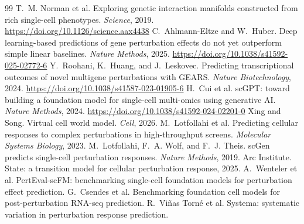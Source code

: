 \documentclass[11pt]{article}
\begin{document}
\begin{thebibliography}{99}
 T.~M. Norman et al. Exploring genetic interaction manifolds constructed from rich single-cell phenotypes. \emph{Science}, 2019. \url{https://doi.org/10.1126/science.aax4438}
 C.~Ahlmann-Eltze and W.~Huber. Deep learning-based predictions of gene perturbation effects do not yet outperform simple linear baselines. \emph{Nature Methods}, 2025. \url{https://doi.org/10.1038/s41592-025-02772-6}
 Y.~Roohani, K.~Huang, and J.~Leskovec. Predicting transcriptional outcomes of novel multigene perturbations with GEARS. \emph{Nature Biotechnology}, 2024. \url{https://doi.org/10.1038/s41587-023-01905-6}
 H.~Cui et al. scGPT: toward building a foundation model for single-cell multi-omics using generative AI. \emph{Nature Methods}, 2024. \url{https://doi.org/10.1038/s41592-024-02201-0}
 Xing and Song. Virtual cell world model. \emph{Cell}, 2026. %
 M.~Lotfollahi et al. Predicting cellular responses to complex perturbations in high-throughput screens. \emph{Molecular Systems Biology}, 2023. %
 M.~Lotfollahi, F.~A. Wolf, and F.~J. Theis. scGen predicts single-cell perturbation responses. \emph{Nature Methods}, 2019. %
 Arc Institute. State: a transition model for cellular perturbation response, 2025. %
 A.~Wenteler et al. PertEval-scFM: benchmarking single-cell foundation models for perturbation effect prediction. %
 G.~Csendes et al. Benchmarking foundation cell models for post-perturbation RNA-seq prediction. %
 R.~Vi\~nas Torn\'e et al. Systema: systematic variation in perturbation response prediction. %
\end{thebibliography}
\end{document}
